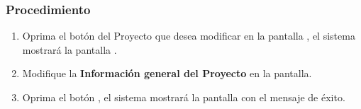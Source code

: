\subsubsection{Procedimiento}
\begin{enumerate}
	\item Oprima el botón \btnEditar del Proyecto que desea modificar en la pantalla , el sistema mostrará la pantalla . 

	
	\item Modifique la \textbf{Información general del Proyecto} en la pantalla.
	
	\item Oprima el botón , el sistema mostrará la pantalla  con el mensaje de éxito.
\end{enumerate}

